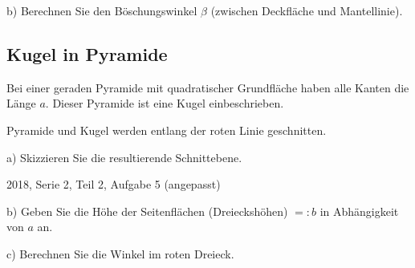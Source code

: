 b) Berechnen Sie den Böschungswinkel $\beta$ (zwischen Deckfläche und
Mantellinie).

\subsection{Kugel in Pyramide}
Bei einer geraden Pyramide mit quadratischer Grundfläche haben alle
Kanten die Länge $a$. Dieser Pyramide ist eine Kugel einbeschrieben.

Pyramide und Kugel werden entlang der roten Linie geschnitten.

a) Skizzieren Sie die resultierende Schnittebene.

{\tiny{2018, Serie 2, Teil 2, Aufgabe 5 (angepasst)}}


b) Geben Sie die Höhe der Seitenflächen (Dreieckshöhen) $=:b$ in
Abhängigkeit von $a$ an.

c) Berechnen Sie die Winkel im roten Dreieck.



